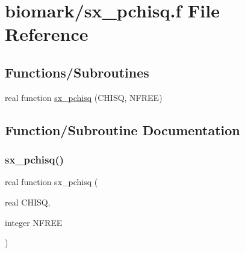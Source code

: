\hypertarget{sx__pchisq_8f}{}\section{biomark/sx\+\_\+pchisq.f File Reference}
\label{sx__pchisq_8f}
\subsection*{Functions/\+Subroutines}
\begin{DoxyCompactItemize}
\item 
real function \hyperlink{sx__pchisq_8f_a5ae83809a22ddb4f35d983c014d87e33}{sx\+\_\+pchisq} (C\+H\+I\+SQ, N\+F\+R\+EE)
\end{DoxyCompactItemize}


\subsection{Function/\+Subroutine Documentation}
\mbox{\label{sx__pchisq_8f_a5ae83809a22ddb4f35d983c014d87e33}} 
\subsubsection{\texorpdfstring{sx\+\_\+pchisq()}{sx\_pchisq()}}
{\footnotesize\ttfamily real function sx\+\_\+pchisq (\begin{DoxyParamCaption}\item[{real}]{C\+H\+I\+SQ,  }\item[{integer}]{N\+F\+R\+EE }\end{DoxyParamCaption})}

